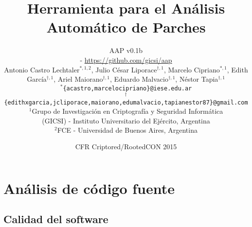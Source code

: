 \documentclass{beamer}
\begin{document}
\title{Herramienta para el Análisis\\ Automático de Parches}

\author{
	\scriptsize{
		AAP v0.1b\\
		- \url{https://github.com/gicsi/aap}
		\\
	}
	\vspace{5mm}
	\tiny{
		Antonio Castro Lechtaler$^{\ast,1,2}$, Julio César Liporace$^{\dagger,1}$, Marcelo Cipriano$^{\ast,1}$, Edith García$^{\dagger,1}$, Ariel Maiorano$^{\dagger,1}$, Eduardo Malvacio$^{\dagger,1}$, Néstor Tapia$^{\dagger,1}$
		\\
		\texttt{$^{\ast}$\{acastro,marcelocipriano\}@iese.edu.ar}
		\\
		\texttt{$^{\dagger}$\{edithxgarcia,jcliporace,maiorano,edumalvacio,tapianestor87\}@gmail.com}
		\\
		$^1$Grupo de Investigación en Criptografía y Seguridad Informática \\(GICSI) - Instituto Universitario del Ejército, Argentina
		\\
		$^2$FCE - Universidad de Buenos Aires, Argentina
	}
}

\date{\scriptsize{CFR Criptored/RootedCON 2015}}

\frame{\titlepage}


\renewcommand\refname{Referencias}


\section{Análisis de código fuente}

	\subsection{Calidad del software}
\end{document}
